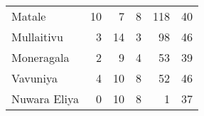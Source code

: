 \begin{tabular}{lrrrrr}
Matale       &          10 &           7 &            8 &              118 &          40 \\
Mullaitivu   &           3 &          14 &            3 &               98 &          46 \\
Moneragala   &           2 &           9 &            4 &               53 &          39 \\
Vavuniya     &           4 &          10 &            8 &               52 &          46 \\
Nuwara Eliya &           0 &          10 &            8 &                1 &          37 \\
\bottomrule
\end{tabular}
